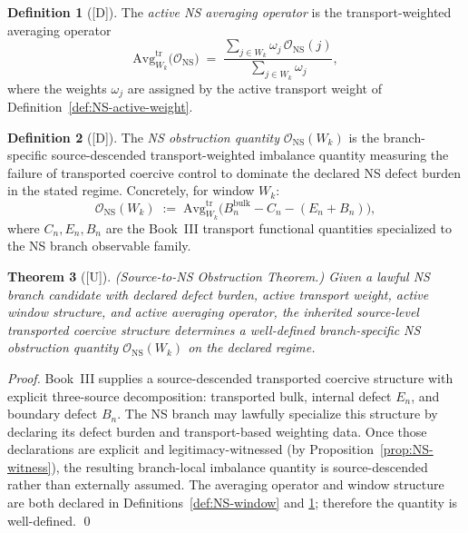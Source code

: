 \documentclass[12pt,oneside]{amsbook}
\theoremstyle{plain}
\newtheorem{theorem}{Theorem}[section]
\theoremstyle{definition}
\newtheorem{definition}[theorem]{Definition}
\theoremstyle{remark}
\newcommand{\status}[1]{\textup{[#1]}}
\begin{document}
\begin{definition}[\status{D}]\label{def:NS-averaging-op}
The \emph{active NS averaging operator} is the
transport-weighted averaging operator
\[
 \mathrm{Avg}^{\mathrm{tr}}_{W_k}
 \bigl(\mathcal{O}_{\mathrm{NS}}\bigr)
 \;=\;
 \frac{\sum_{j \in W_k} \omega_j\, \mathcal{O}_{\mathrm{NS}}(j)}
 {\sum_{j \in W_k} \omega_j},
\]
where the weights $\omega_j$ are assigned by the active
transport weight of Definition~\ref{def:NS-active-weight}.
\end{definition}

\begin{definition}[\status{D}]\label{def:NS-obstruction}
The \emph{NS obstruction quantity} $\mathcal{O}_{\mathrm{NS}}(W_k)$
is the branch-specific source-descended transport-weighted
imbalance quantity measuring the failure of transported
coercive control to dominate the declared NS defect burden in
the stated regime. Concretely, for window $W_k$:
\[
 \mathcal{O}_{\mathrm{NS}}(W_k)
 \;:=\;
 \mathrm{Avg}^{\mathrm{tr}}_{W_k}
 \bigl(B_n^{\mathrm{bulk}} - C_n - (E_n + B_n)\bigr),
\]
where $C_n, E_n, B_n$ are the Book~III transport functional
quantities specialized to the NS branch observable family.
\end{definition}

\begin{theorem}[\status{U}]\label{thm:NS-obstruction-exists}
\textup{(Source-to-NS Obstruction Theorem.)} Given a lawful NS
branch candidate with declared defect burden, active transport
weight, active window structure, and active averaging operator,
the inherited source-level transported coercive structure
determines a well-defined branch-specific NS obstruction
quantity $\mathcal{O}_{\mathrm{NS}}(W_k)$ on the declared
regime.
\end{theorem}

\begin{proof}
Book~III supplies a source-descended transported coercive
structure with explicit three-source decomposition: transported
bulk, internal defect $E_n$, and boundary defect $B_n$. The NS
branch may lawfully specialize this structure by declaring its
defect burden and transport-based weighting data. Once those
declarations are explicit and legitimacy-witnessed (by
Proposition~\ref{prop:NS-witness}), the resulting branch-local
imbalance quantity is source-descended rather than externally
assumed. The averaging operator and window structure are both
declared in Definitions~\ref{def:NS-window} and
\ref{def:NS-averaging-op}; therefore the quantity is
well-defined.
\qed
\end{proof}
\end{document}
